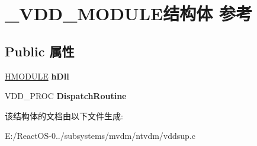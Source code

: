 \hypertarget{struct___v_d_d___m_o_d_u_l_e}{}\section{\+\_\+\+V\+D\+D\+\_\+\+M\+O\+D\+U\+L\+E结构体 参考}
\label{struct___v_d_d___m_o_d_u_l_e}
\subsection*{Public 属性}
\begin{DoxyCompactItemize}
\item 
\mbox{\label{struct___v_d_d___m_o_d_u_l_e_a422481d5e778aec6dc6b247c8e64b491}} 
\hyperlink{interfacevoid}{H\+M\+O\+D\+U\+LE} {\bfseries h\+Dll}
\item 
\mbox{\label{struct___v_d_d___m_o_d_u_l_e_a09bda4470782475bb27c488e20dfbbe1}} 
V\+D\+D\+\_\+\+P\+R\+OC {\bfseries Dispatch\+Routine}
\end{DoxyCompactItemize}


该结构体的文档由以下文件生成\+:\begin{DoxyCompactItemize}
\item 
E\+:/\+React\+O\+S-\/0../subsystems/mvdm/ntvdm/vddsup.\+c\end{DoxyCompactItemize}
